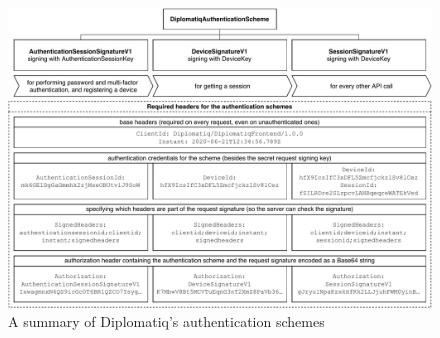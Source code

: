 \begin{figure}[!htb]
    \includegraphics[width=\textwidth]{figures/authentication-schemes.pdf}
    \caption{A summary of Diplomatiq's authentication schemes}
    \label{fig:authentication-schemes}
\end{figure}

